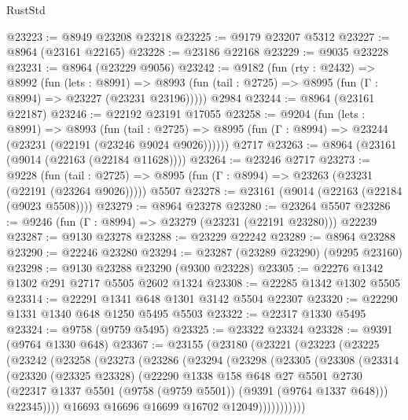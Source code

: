 \begin{lexlean}{RustStd}
\begin{coremodule}
@23223 := @8949 @23208 @23218
@23225 := @9179 @23207 @5312
@23227 := @8964 (@23161 @22165)
@23228 := @23186 @22168
@23229 := @9035 @23228
@23231 := @8964 (@23229 @9056)
@23242 := @9182
    (fun (rty : @2432) =>
    @8992
      (fun (lets : @8991) =>
      @8993 (fun (tail : @2725) => @8995 (fun (Γ : @8994) => @23227 (@23231 @23196)))))
    @2984
@23244 := @8964 (@23161 @22187)
@23246 := @22192 @23191 @17055
@23258 := @9204
    (fun (lets : @8991) =>
    @8993
      (fun (tail : @2725) =>
      @8995 (fun (Γ : @8994) => @23244 (@23231 (@22191 (@23246 @9024 @9026))))))
    @2717
@23263 := @8964 (@23161 (@9014 (@22163 (@22184 @11628))))
@23264 := @23246 @2717
@23273 := @9228
    (fun (tail : @2725) => @8995 (fun (Γ : @8994) => @23263 (@23231 (@22191 (@23264 @9026)))))
    @5507
@23278 := @23161 (@9014 (@22163 (@22184 (@9023 @5508))))
@23279 := @8964 @23278
@23280 := @23264 @5507
@23286 := @9246 (fun (Γ : @8994) => @23279 (@23231 (@22191 @23280))) @22239
@23287 := @9130 @23278
@23288 := @23229 @22242
@23289 := @8964 @23288
@23290 := @22246 @23280
@23294 := @23287 (@23289 @23290) (@9295 @23160)
@23298 := @9130 @23288 @23290 (@9300 @23228)
@23305 := @22276 @1342 @1302 @291 @2717 @5505 @2602 @1324
@23308 := @22285 @1342 @1302 @5505
@23314 := @22291 @1341 @648 @1301 @3142 @5504 @22307
@23320 := @22290 @1331 @1340 @648 @1250 @5495 @5503
@23322 := @22317 @1330 @5495
@23324 := @9758 (@9759 @5495)
@23325 := @23322 @23324
@23328 := @9391 (@9764 @1330 @648)
@23367 := @23155
    (@23180
      (@23221
        (@23223
          (@23225
            (@23242
              (@23258
                (@23273
                  (@23286
                    (@23294
                      (@23298
                        (@23305
                          (@23308
                            (@23314
                              (@23320
                                (@23325 @23328)
                                (@22290
                                  @1338
                                  @158
                                  @648
                                  @27
                                  @5501
                                  @2730
                                  (@22317
                                    @1337
                                    @5501
                                    (@9758 (@9759 @5501))
                                    (@9391 (@9764 @1337 @648)))
                                  @22345))))
                          @16693
                          @16696
                          @16699
                          @16702
                          @12049)))))))))))

\end{coremodule}
\end{lexlean}
